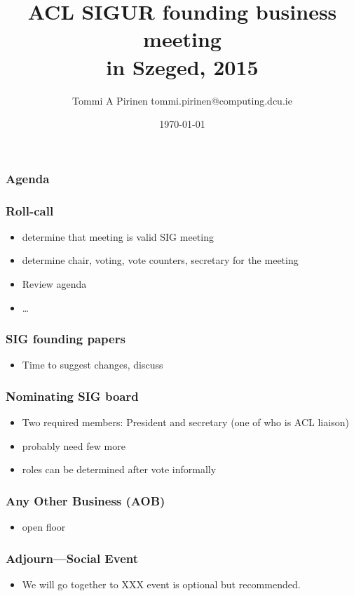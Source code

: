 \documentclass{beamer}
\title{ACL SIGUR founding business meeting\\
\scriptsize{in Szeged, 2015}}
\author{Tommi A Pirinen \scriptsize \guilsinglleft tommi.pirinen@computing.dcu.ie \guilsinglright }
\institute{DCU, CNGL}
\date{\today}
\makeatletter
\newcommand\listofframes{\@starttoc{lbf}}
\makeatother
\begin{document}

\maketitle

\begin{frame}
    \frametitle{Agenda}
    \listofframes
\end{frame}

\begin{frame}
    \frametitle{Roll-call}
    \begin{itemize}
        \item determine that meeting is valid SIG meeting
        \item determine chair, voting, vote counters, secretary for the meeting
        \item Review agenda
        \item 
            \ldots
    \end{itemize}
\end{frame}

\begin{frame}
    \frametitle{SIG founding papers}
    \begin{itemize}
        \item Time to suggest changes, discuss
    \end{itemize}
\end{frame}

\begin{frame}
    \frametitle{Nominating SIG board}
    \begin{itemize}
        \item Two required members:
            President and secretary (one of who is ACL liaison)
        \item probably need few more
        \item roles can be determined after vote informally
    \end{itemize}
\end{frame}

\begin{frame}
    \frametitle{Any Other Business (AOB)}
    \begin{itemize}
        \item open floor
    \end{itemize}
\end{frame}

\begin{frame}
    \frametitle{Adjourn---Social Event}
    \begin{itemize}
        \item We will go together to XXX
            event is optional but recommended.
    \end{itemize}
\end{frame}
\end{document}
